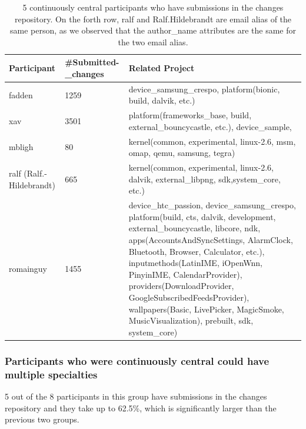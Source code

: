 \documentclass[10pt, conference, compsocconf]{IEEEtran}
\begin{document}
\begin{table}[!t]
\caption{5 continuously central participants who have submissions in the changes repository. On the forth row, ralf and Ralf.Hildebrandt are email alias of the same person, as we observed that the author\_name attributes are the same for the two email alias.}
\label{continuous_project}
\centering
\begin{tabular}{|p{1.2cm}|p{1.1cm}|p{4.6cm}|}
\hline
Participant & \#Submitted-\_changes & Related Project \\
\hline
fadden & 1259 & device\_samsung\_crespo, platform(bionic, build, dalvik, etc.) \\
\hline
xav & 3501 & platform(frameworks\_base, build, external\_bouncycastle, etc.), device\_sample, \\
\hline
mbligh & 80 & kernel(common, experimental, linux-2.6, msm, omap, qemu, samsung, tegra) \\
\hline
ralf (Ralf.-Hildebrandt) & 665 & kernel(common, experimental, linux-2.6, dalvik, external\_libpng, sdk,system\_core, etc.) \\
\hline
romainguy & 1455 & device\_htc\_passion, device\_samsung\_crespo, platform(build, cts, dalvik, development, external\_bouncycastle, libcore, ndk, apps(AccountsAndSyncSettings, AlarmClock,
Bluetooth, Browser, Calculator, etc.),
inputmethods(LatinIME, iOpenWnn, PinyinIME, CalendarProvider),
providers(DownloadProvider, GoogleSubscribedFeedsProvider), wallpapers(Basic, LivePicker,
MagicSmoke, MusicVisualization), prebuilt, sdk, system\_core) \\
\hline
\end{tabular}
\end{table}


\subsubsection{Participants who were continuously central could have multiple specialties}

5 out of the 8 participants in this group have submissions in the
changes repository and they take up to 62.5\%, which is significantly
larger than the previous two groups.
\end{document}
